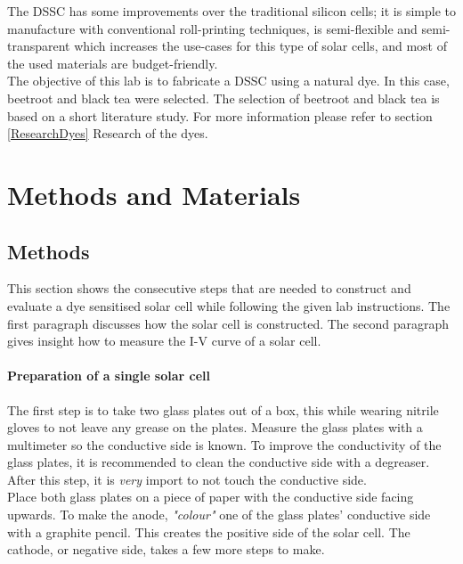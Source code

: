 \documentclass[conference]{IEEEtran}
\begin{document}
The DSSC has some improvements over the traditional silicon cells; it is simple to manufacture with conventional roll-printing techniques, is semi-flexible and semi-transparent which increases the use-cases for this type of solar cells, and most of the used materials are budget-friendly.\\

The objective of this lab is to fabricate a DSSC using a natural dye. In this case, beetroot and black tea were selected. The selection of beetroot and black tea is based on a short literature study.  For more information please refer to section \ref{ResearchDyes} Research of the dyes.\\

\section{Methods and Materials}

\subsection{Methods}
This section shows the consecutive steps that are needed to construct and evaluate a dye sensitised solar cell while following the given lab instructions. The first paragraph discusses how the solar cell is constructed. The second paragraph gives insight how to measure the I-V curve of a solar cell.\\

\paragraph{Preparation of a single solar cell}
The first step is to take two glass plates out of a box, this while wearing nitrile gloves to not leave any grease on the plates. Measure the glass plates with a multimeter so the conductive side is known. To improve the conductivity of the glass plates, it is recommended to clean the conductive side with a degreaser. After this step, it is \emph{very} import to not touch the conductive side. \\

Place both glass plates on a piece of paper with the conductive side facing upwards. To make the anode, \textit{"colour"} one of the glass plates' conductive side with a graphite pencil. This creates the positive side of the solar cell. The cathode, or negative side, takes a few more steps to make.\\ 
\end{document}
